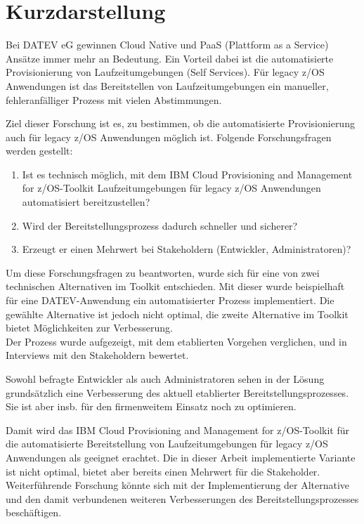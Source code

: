 \thispagestyle{empty}
\section*{Kurzdarstellung}
\label{sec:kurzdarstellung}
Bei DATEV eG gewinnen Cloud Native und PaaS (Plattform as a Service) Ansätze immer mehr an Bedeutung.
Ein Vorteil dabei ist die automatisierte Provisionierung von Laufzeitumgebungen (Self Services).
Für legacy z/OS Anwendungen ist das Bereitstellen von Laufzeitumgebungen ein manueller, fehleranfälliger Prozess mit vielen Abstimmungen.

Ziel dieser Forschung ist es, zu bestimmen, ob die automatisierte Provisionierung auch für legacy z/OS Anwendungen möglich ist.
Folgende Forschungsfragen werden gestellt:
\begin{enumerate}
\item Ist es technisch möglich, mit dem \glqq IBM Cloud Provisioning and Management for z/OS\grqq-Toolkit Laufzeitumgebungen für legacy z/OS Anwendungen automatisiert bereitzustellen?
\item Wird der Bereitstellungsprozess dadurch schneller und sicherer?
\item Erzeugt er einen Mehrwert bei Stakeholdern (Entwickler, Administratoren)?
\end{enumerate}
Um diese Forschungsfragen zu beantworten, wurde sich für eine von zwei technischen Alternativen im Toolkit entschieden. 
Mit dieser wurde beispielhaft für eine DATEV-Anwendung ein automatisierter Prozess implementiert.
Die gewählte Alternative ist jedoch nicht optimal, die zweite Alternative im Toolkit bietet Möglichkeiten zur Verbesserung.\\
Der Prozess wurde aufgezeigt, mit dem etablierten Vorgehen verglichen, und in Interviews mit den Stakeholdern bewertet.

Sowohl befragte Entwickler als auch Administratoren sehen in der Lösung grundsätzlich eine Verbesserung des aktuell etablierter Bereitstellungsprozesses.
Sie ist aber  insb. für den firmenweitem Einsatz noch zu optimieren.

Damit wird das \glqq IBM Cloud Provisioning and Management for z/OS\grqq-Toolkit für die automatisierte Bereitstellung von Laufzeitumgebungen für legacy z/OS Anwendungen als geeignet erachtet.
Die in dieser Arbeit implementierte Variante ist nicht optimal, bietet aber bereits einen Mehrwert für die Stakeholder.
Weiterführende Forschung könnte sich mit der Implementierung der Alternative und den damit verbundenen weiteren Verbesserungen des Bereitstellungsprozesses beschäftigen. 



